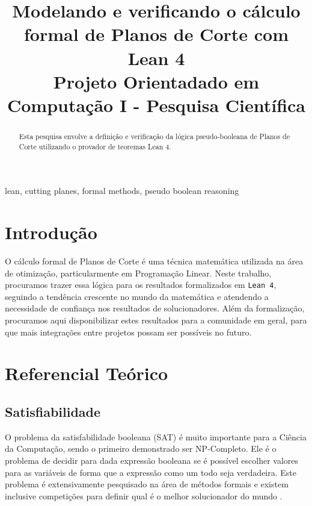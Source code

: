 \documentclass[conference]{IEEEtran}
\begin{document}
\title{Modelando e verificando o cálculo formal de Planos de Corte com Lean 4\\
{\footnotesize Projeto Orientadado em Computação I - Pesquisa Científica}
}

\author{
}

\maketitle

\begin{abstract}
    Esta pesquisa envolve a definição e verificação da lógica pseudo-booleana de
    Planos de Corte utilizando o provador de teoremas Lean 4.
\end{abstract}

\begin{IEEEkeywords}
    lean, cutting planes, formal methods, pseudo boolean reasoning
\end{IEEEkeywords}

\section{Introdução}

O cálculo formal de Planos de Corte\cite{CutPlane} é uma técnica matemática utilizada na área de otimização,
particularmente em Programação Linear.
Neste trabalho, procuramos trazer essa lógica para os resultados formalizados em \texttt{Lean 4},
seguindo a tendência crescente no mundo da matemática e atendendo a necessidade de confiança
nos resultados de solucionadores. Além da formalização, procuramos aqui disponibilizar estes
resultados para a comunidade em geral, para que mais integrações entre projetos possam ser possíveis
no futuro.

\section{Referencial Teórico}

\subsection{Satisfiabilidade}
O problema da satisfabilidade booleana (SAT) é muito importante para a Ciência da Computação, sendo o
primeiro demonstrado ser NP-Completo. Ele é o problema de decidir para dada expressão booleana
se é possível escolher valores para as variáveis de forma que a expressão como um todo seja verdadeira.
Este problema é extensivamente pesquisado na área de métodos formais\cite{SatLive} e existem inclusive competições para
definir qual é o melhor solucionador do mundo \cite{SatComp}.
\end{document}
